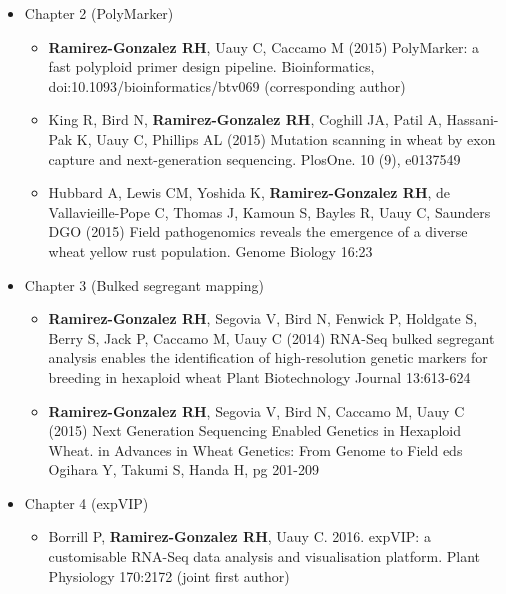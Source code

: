 \begin{itemize}
\item Chapter 2 (PolyMarker)
\begin{itemize}
	\item \textbf{Ramirez-Gonzalez RH}, Uauy C, Caccamo M (2015) PolyMarker: a fast polyploid primer design pipeline. Bioinformatics, doi:10.1093/bioinformatics/btv069 (corresponding author)
	\item King R, Bird N, \textbf{Ramirez-Gonzalez RH}, Coghill JA, Patil A, Hassani-Pak K, Uauy C, Phillips AL (2015) Mutation scanning in wheat by exon capture and next-generation sequencing. PlosOne. 10 (9), e0137549
	\item Hubbard A, Lewis CM, Yoshida K, \textbf{\textbf{Ramirez-Gonzalez RH}}, de Vallavieille-Pope C, Thomas J, Kamoun S, Bayles R, Uauy C, Saunders DGO (2015) Field pathogenomics reveals the emergence of a diverse wheat yellow rust population. Genome Biology 16:23 
\end{itemize}

 \item Chapter 3 (Bulked segregant mapping)
\begin{itemize}
\item	\textbf{Ramirez-Gonzalez RH}, Segovia V, Bird N, Fenwick P, Hold\-gate S, Berry S, Jack P, Caccamo M, Uauy C (2014) RNA-Seq bulked segregant analysis enables the identification of high-resolution genetic markers for breeding in hexaploid wheat Plant Biotechnology Journal 13:613-624
\item	\textbf{Ramirez-Gonzalez RH}, Segovia V, Bird N, Caccamo M, Uauy C (2015) Next Generation Sequencing Enabled Genetics in Hexaploid Wheat. in Advances in Wheat Genetics: From Genome to Field eds Ogihara Y, Takumi S, Handa H, pg 201-209
\end{itemize}
\item Chapter 4 (expVIP)
\begin{itemize}
	\item Borrill P, \textbf{Ramirez-Gonzalez RH}, Uauy C. 2016. expVIP: a customisable RNA-Seq data analysis and visualisation platform. Plant Physiology 170:2172 (joint first author) 
\end{itemize}
\end{itemize}





